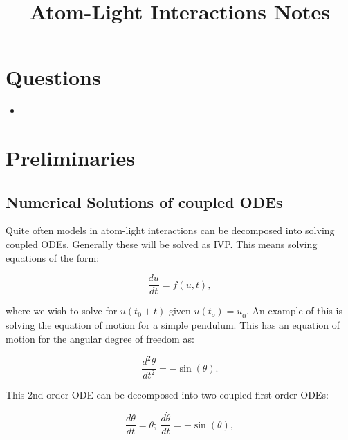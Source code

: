 \documentclass[11pt,a4paper]{article}
\begin{document}

\title{Atom-Light Interactions Notes}

\maketitle

\section{Questions}
\begin{itemize}
    \item 
\end{itemize}

\section{Preliminaries}

\subsection{Numerical Solutions of coupled ODEs}

Quite often models in atom-light interactions can be decomposed into solving coupled ODEs. Generally these will be solved as IVP. This means solving equations of the form:

\begin{equation}
    \frac{d \underline{u}}{dt} = \underline{f}(\underline{u}, t),
    \label{CoupledODEs}
\end{equation}

\noindent where we wish to solve for $\underline{u}(t_0 + t)$ given $\underline{u}(t_o) = \underline{u}_0$. An example of this is solving the equation of motion for a simple pendulum. This has an equation of motion for the angular degree of freedom as:

\begin{equation}
    \frac{d^2 \theta}{dt^2} = -\sin(\theta).
    \label{PendulumEOM}
\end{equation}

\noindent This 2nd order ODE can be decomposed into two coupled first order ODEs:

\begin{equation}
    \frac{d \theta}{dt} = \dot{\theta}; ~ \frac{d \dot{\theta}}{dt} = -\sin(\theta),
    \label{CoupledPendulumODEs}
\end{equation}
\end{document}
